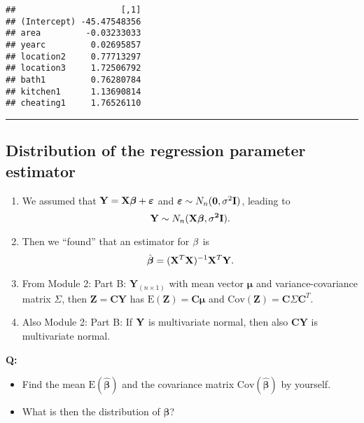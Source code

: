 \documentclass[]{article}
\providecommand{\tightlist}{%
  \setlength{\itemsep}{0pt}\setlength{\parskip}{0pt}}
\begin{document}
\begin{verbatim}
##                     [,1]
## (Intercept) -45.47548356
## area         -0.03233033
## yearc         0.02695857
## location2     0.77713297
## location3     1.72506792
## bath1         0.76280784
## kitchen1      1.13690814
## cheating1     1.76526110
\end{verbatim}

\begin{center}\rule{0.5\linewidth}{\linethickness}\end{center}

\hypertarget{distribution-of-the-regression-parameter-estimator}{%
\subsection{Distribution of the regression parameter
estimator}\label{distribution-of-the-regression-parameter-estimator}}

\begin{enumerate}
\def\labelenumi{\arabic{enumi}.}
\tightlist
\item
  We assumed that
  \({\bf Y=X \boldsymbol\beta}+{\boldsymbol \varepsilon}\) and
  \(\boldsymbol\varepsilon\sim N_n({\bf 0},\sigma^2 {\bf I})\), leading
  to \[ {\bf Y} \sim N_{n}(\bf X \boldsymbol \beta,\sigma^2 {\bf I}).\]
\item
  Then we ``found'' that an estimator for \({\bf \beta}\) is
  \[ \hat{\boldsymbol\beta}=({\bf X}^T{\bf X})^{-1} {\bf X}^T {\bf Y}.\]
\item
  From Module 2: Part B: \(\mathbf{Y}_{(n\times 1)}\) with mean vector
  \(\mathbf{\mu}\) and variance-covariance matrix \(\Sigma\), then
  \(\mathbf{Z}=\mathbf{C}\mathbf{Y}\) has
  \(\text{E}(\mathbf{Z})=\mathbf{C}\mathbf{\mu}\) and
  \(\text{Cov}(\mathbf{Z})= \mathbf{C}\Sigma\mathbf{C}^T\).
\item
  Also Module 2: Part B: If \({\bf Y}\) is multivariate normal, then
  also \(\mathbf{C}\mathbf{Y}\) is multivariate normal.
\end{enumerate}

\textbf{Q:}

\begin{itemize}
\tightlist
\item
  Find the mean \(\text{E}(\hat{\boldsymbol\beta})\) and the covariance
  matrix \(\text{Cov}(\hat{\boldsymbol\beta})\) by yourself.
\item
  What is then the distribution of \(\hat{\boldsymbol\beta}\)?
\end{itemize}
\end{document}
